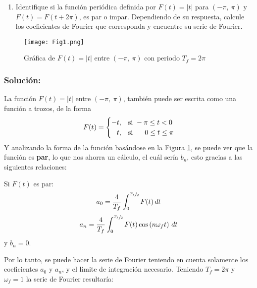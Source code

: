 \begin{multicols}{2}
\begin{enumerate}[leftmargin=15pt, resume]
    \item Identifique si la función periódica definida por $F(t)=|t|$ para $(-\pi,~\pi)$ y $F(t)=F(t+2\pi)$, es par o impar. Dependiendo de su respuesta, calcule los coeficientes de Fourier que corresponda y encuentre su serie de Fourier.
\end{enumerate}

\begin{figure}[H]
\begin{center}
\texttt{[image: Fig1.png]}
\caption{Gráfica de $F(t)=|t|$ entre $(-\pi,~\pi)$ con periodo $T_f = 2\pi$}
\label{figenu:2}
\end{center}
\end{figure}

\subsubsection*{\textbf{Solución:}}

La función $F(t)=|t|$ entre $(-\pi,~\pi)$, también puede ser escrita como una función a trozos, de la forma
\begin{equation}
    F(t) =
    \begin{cases}
    -t,&\text{si } -\pi \leq t < 0\\
    \hphantom{-}t,&\text{si } \hphantom{-\pi} 0 \leq t \leq \pi
    \end{cases}
    \label{eq:14}
\end{equation}
Y analizando la forma de la función basándose en la Figura \ref{figenu:2}, se puede ver que la función es \textbf{par}, lo que nos ahorra un cálculo, el cuál sería $b_n$, esto gracias a las siguientes relaciones:

Si $F(t)$ es par:
\begin{equation}
    a_0 = \frac{4}{T_f} \int_{0}^{\sfrac{T_f}{2}} F(t) \,dt
    \label{eq:15}
\end{equation}
\begin{equation}
    a_n = \frac{4}{T_f} \int_{0}^{\sfrac{T_f}{2}} F(t)\cos\left(n \omega_f t\right) \,dt
    \label{eq:16}
\end{equation}
y $b_n = 0$.

Por lo tanto, se puede hacer la serie de Fourier teniendo en cuenta solamente los coeficientes $a_0$ y $a_n$, y el límite de integración necesario. Teniendo $T_f = 2\pi$ y $\omega_f = 1$ la serie de Fourier resultaría:


\end{multicols}
